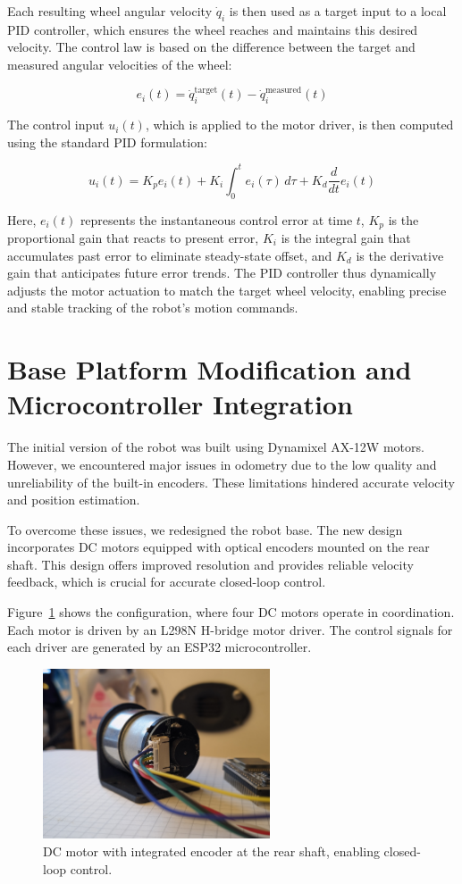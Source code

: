 Each resulting wheel angular velocity \( \dot{q}_i \) is then used as a target input to a local PID controller, which ensures the wheel reaches and maintains this desired velocity. The control law is based on the difference between the target and measured angular velocities of the wheel:

\[
e_i(t) = \dot{q}_i^{\text{target}}(t) - \dot{q}_i^{\text{measured}}(t)
\]

The control input \( u_i(t) \), which is applied to the motor driver, is then computed using the standard PID formulation:

\[
u_i(t) = K_p e_i(t) + K_i \int_{0}^{t} e_i(\tau)\, d\tau + K_d \frac{d}{dt} e_i(t)
\]

Here, \( e_i(t) \) represents the instantaneous control error at time \( t \), \( K_p \) is the proportional gain that reacts to present error, \( K_i \) is the integral gain that accumulates past error to eliminate steady-state offset, and \( K_d \) is the derivative gain that anticipates future error trends. The PID controller thus dynamically adjusts the motor actuation to match the target wheel velocity, enabling precise and stable tracking of the robot's motion commands.

\section{Base Platform Modification and Microcontroller Integration}
The initial version of the robot was built using Dynamixel AX-12W motors. However, we encountered major issues in odometry due to the low quality and unreliability of the built-in encoders. These limitations hindered accurate velocity and position estimation.

To overcome these issues, we redesigned the robot base. The new design incorporates DC motors equipped with optical encoders mounted on the rear shaft. This design offers improved resolution and provides reliable velocity feedback, which is crucial for accurate closed-loop control.

Figure~\ref{fig:encoder-mounting} shows the configuration, where four DC motors operate in coordination. Each motor is driven by an L298N H-bridge motor driver. The control signals for each driver are generated by an ESP32 microcontroller.

\begin{figure}[H]
    \centering
    \includegraphics[width=0.6\textwidth]{assets/images/hardware/img2.jpeg}  %
    \caption{DC motor with integrated encoder at the rear shaft, enabling closed-loop control.}
    \label{fig:encoder-mounting}
\end{figure}

